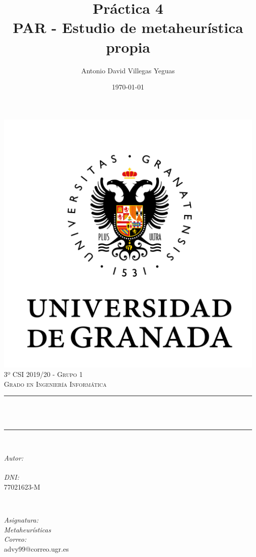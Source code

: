 \documentclass[12pt, spanish]{article}
\title{Práctica 4\\
PAR - Estudio de metaheurística propia  \hspace{0.05cm} }
\author{Antonio David Villegas Yeguas}
\date{\today}
\makeatletter
\let\thetitle\@title
\let\theauthor\@author
\makeatother
\begin{document}

\begin{titlepage}
    \centering
    \vspace*{0.3 cm}
    \includegraphics[scale = 0.50]{ugr.png}\\[0.7 cm]
    \textsc{\large 3º CSI 2019/20 - Grupo 1}\\[0.5 cm]
    \textsc{\large Grado en Ingeniería Informática}\\[0.5 cm]
    \rule{\linewidth}{0.2 mm} \\[0.2 cm]
    { \huge \bfseries \thetitle}\\
    \rule{\linewidth}{0.2 mm} \\[1 cm]

    \begin{minipage}{0.4\textwidth}
        \begin{flushleft} \large
            \emph{Autor:}\\
            \theauthor\\
			 \emph{DNI:}\\
            77021623-M
            \end{flushleft}
            \end{minipage}~
            \begin{minipage}{0.4\textwidth}
            \begin{flushright} \large
            \emph{Asignatura: \\
            Metaheurísticas}   \\
            \emph{Correo:}\\
            advy99@correo.ugr.es
        \end{flushright}
    \end{minipage}\\[0.5cm]


\end{titlepage}
\end{document}
